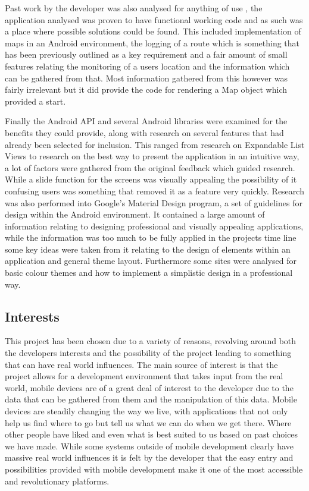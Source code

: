 Past work by the developer was also analysed for anything of use , the application analysed was proven to have functional working code and as such was a place where possible solutions could be found. This included implementation of maps in an Android environment, the logging of a route which is something that has been previously outlined as a key requirement and a fair amount of small features relating the monitoring of a users location and the information which can be gathered from that. Most information gathered from this however was fairly irrelevant but it did provide the code for rendering a Map object which provided a start.

Finally the Android API\cite{api} and several Android libraries were examined for the benefits they could provide, along with research on several features that had already been selected for inclusion. This ranged from research on Expandable List Views to research on the best way to present the application in an intuitive way, a lot of factors were gathered from the original feedback which guided research. While a slide function for the screens was visually appealing the possibility of it confusing users was something that removed it as a feature very quickly. Research was also performed into Google's Material Design program\cite{material}, a set of guidelines for design within the Android environment. It contained a large amount of information relating to designing professional and visually appealing applications, while the information was too much to be fully applied in the projects time line some key ideas were taken from it relating to the design of elements within an application and general theme layout. Furthermore some sites were analysed for basic colour themes and how to implement a simplistic design in a professional way.
\subsection{Interests}
This project has been chosen due to a variety of reasons, revolving around both the developers interests and the possibility of the project leading to something that can have real world influences. The main source of interest is that the project allows for a development environment that takes input from the real world, mobile devices are of a great deal of interest to the developer due to the data that can be gathered from them and the manipulation of this data. Mobile devices are steadily changing the way we live, with applications that not only help us find where to go but tell us what we can do when we get there. Where other people have liked and even what is best suited to us based on past choices we have made. While some systems outside of mobile development clearly have massive real world influences it is felt by the developer that the easy entry and possibilities provided with mobile development make it one of the most accessible and revolutionary platforms.

